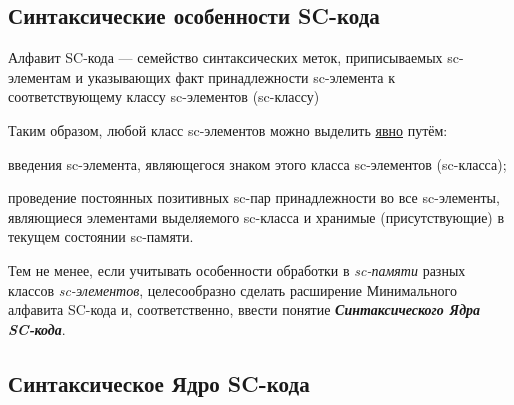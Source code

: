 \newpage
\subsection{Синтаксические особенности SC-кода}
\label{sec_syntactic_sc_code}
Алфавит SC-кода --- семейство синтаксических меток, приписываемых sc-элементам и указывающих факт принадлежности sc-элемента к соответствующему классу sc-элементов (sc-классу)

\begin{SCn}
\end{SCn}

Таким образом, любой класс sc-элементов можно выделить \underline{явно} путём:
\begin{textitemize}
	\item введения sc-элемента, являющегося знаком этого класса sc-элементов (sc-класса);
	\item проведение постоянных позитивных sc-пар принадлежности во все sc-элементы, являющиеся элементами выделяемого sc-класса и хранимые (присутствующие) в текущем состоянии sc-памяти.
\end{textitemize}

\begin{SCn}
\end{SCn}

Тем не менее, если учитывать особенности обработки в \textit{sc-памяти} разных классов \textit{sc-элементов}, целесообразно сделать расширение Минимального алфавита SC-кода и, соответственно, ввести понятие \textbf{\textit{Синтаксического Ядра SC-кода}}.

\newpage
\subsection{Синтаксическое Ядро SC-кода}
\label{sec_syntactic_core_sc_code}


